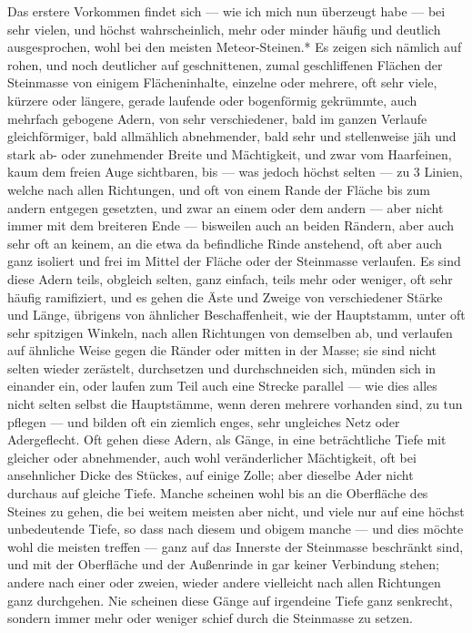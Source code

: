 \documentclass[a4paper, 11pt, oneside, german]{article}
\begin{document}
Das erstere Vorkommen findet sich --- wie ich mich nun überzeugt habe --- bei sehr vielen, und höchst wahrscheinlich, mehr oder minder häufig und deutlich ausgesprochen, wohl bei den meisten Meteor-Steinen.* Es zeigen sich nämlich auf rohen, und noch deutlicher auf geschnittenen, zumal geschliffenen Flächen der Steinmasse von einigem Flächeninhalte, einzelne oder mehrere, oft sehr viele, kürzere oder längere, gerade laufende oder bogenförmig gekrümmte, auch mehrfach gebogene Adern, von sehr verschiedener, bald im ganzen Verlaufe gleichförmiger, bald allmählich abnehmender, bald sehr und stellenweise jäh und stark ab- oder zunehmender Breite und Mächtigkeit, und zwar vom Haarfeinen, kaum dem freien Auge sichtbaren, bis --- was jedoch höchst selten --- zu 3 Linien, welche nach allen Richtungen, und oft von einem Rande der Fläche bis zum andern entgegen gesetzten, und zwar an einem oder dem andern --- aber nicht immer mit dem breiteren Ende --- bisweilen auch an beiden Rändern, aber auch sehr oft an keinem, an die etwa da befindliche Rinde anstehend, oft aber auch ganz isoliert und frei im Mittel der Fläche oder der Steinmasse verlaufen. Es sind diese Adern teils, obgleich selten, ganz einfach, teils mehr oder weniger, oft sehr häufig ramifiziert, und es gehen die Äste und Zweige von verschiedener Stärke und Länge, übrigens von ähnlicher Beschaffenheit, wie der Hauptstamm, unter oft sehr spitzigen Winkeln, nach allen Richtungen von demselben ab, und verlaufen auf ähnliche Weise gegen die Ränder oder mitten in der Masse; sie sind nicht selten wieder zerästelt, durchsetzen und durchschneiden sich, münden sich in einander ein, oder laufen zum Teil auch eine Strecke parallel --- wie dies alles nicht selten selbst die Hauptstämme, wenn deren mehrere vorhanden sind, zu tun pflegen --- und bilden oft ein ziemlich enges, sehr ungleiches Netz oder Adergeflecht. Oft gehen diese Adern, als Gänge, in eine beträchtliche Tiefe mit gleicher oder abnehmender, auch wohl veränderlicher Mächtigkeit, oft bei ansehnlicher Dicke des Stückes, auf einige Zolle; aber dieselbe Ader nicht durchaus auf gleiche Tiefe. Manche scheinen wohl bis an die Oberfläche des Steines zu gehen, die bei weitem meisten aber nicht, und viele nur auf eine höchst unbedeutende Tiefe, so dass nach diesem und obigem manche --- und dies möchte wohl die meisten treffen --- ganz auf das Innerste der Steinmasse beschränkt sind, und mit der Oberfläche und der Außenrinde in gar keiner Verbindung stehen; andere nach einer oder zweien, wieder andere vielleicht nach allen Richtungen ganz durchgehen. Nie scheinen diese Gänge auf irgendeine Tiefe ganz senkrecht, sondern immer mehr oder weniger schief durch die Steinmasse zu setzen.
\end{document}
